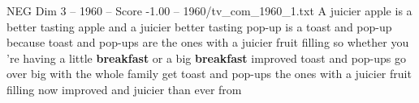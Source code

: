\begin{textsample}{NEG Dim 3 – 1960 – Score -1.00 – 1960/tv\_com\_1960\_1.txt}  \label{ex:f3_neg_075}
A juicier apple is a better tasting apple and a juicier better tasting pop-up is a toast and pop-up because toast and pop-ups are the ones with a juicier fruit filling so whether you 're having a little \textbf{breakfast} or a big \textbf{breakfast} improved toast and pop-ups go over big with the whole family get toast and pop-ups the ones with a juicier fruit filling now improved and juicier than ever from

\end{textsample}
